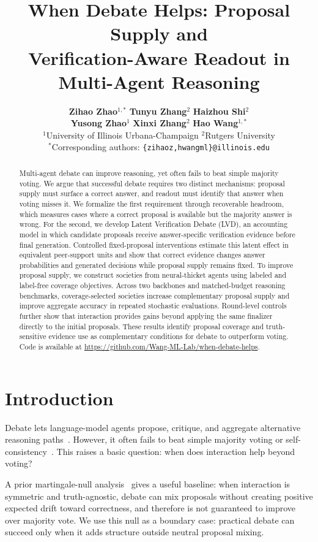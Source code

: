 \documentclass{article}
\title{When Debate Helps:
Proposal Supply and\\Verification-Aware Readout in Multi-Agent Reasoning}
\author{
  \textbf{Zihao Zhao}$^{1,*}$ \quad
  \textbf{Tunyu Zhang}$^{2}$ \quad
  \textbf{Haizhou Shi}$^{2}$
  \\[0.35em]
  \textbf{Yusong Zhao}$^{1}$ \quad
  \textbf{Xinxi Zhang}$^{2}$ \quad
  \textbf{Hao Wang}$^{1,*}$
  \\
  $^{1}$University of Illinois Urbana-Champaign \quad
  $^{2}$Rutgers University
  \\
  $^{*}$Corresponding authors: \texttt{\{zihaoz,hwangml\}@illinois.edu}
}
\newcommand{\readout}{Latent Verification Debate}
\begin{document}
\maketitle

\begin{abstract}
Multi-agent debate can improve reasoning, yet often fails to beat simple
majority voting. We argue that successful debate requires two distinct
mechanisms: proposal supply must surface a correct answer, and readout must
identify that answer when voting misses it. We formalize the first requirement
through recoverable headroom, which measures cases where a correct proposal is
available but the majority answer is wrong. For the second, we develop
\readout{} (LVD), an accounting model in which candidate proposals receive
answer-specific verification evidence before final generation. Controlled
fixed-proposal interventions estimate this latent effect in equivalent
peer-support units and show that correct evidence changes answer probabilities
and generated decisions while proposal supply remains fixed. To
improve proposal supply, we construct societies from neural-thicket agents
using labeled and label-free coverage objectives. Across two backbones and
matched-budget reasoning benchmarks, coverage-selected societies increase
complementary proposal supply and improve aggregate accuracy in repeated
stochastic evaluations. Round-level controls further show that interaction
provides gains beyond applying the same finalizer directly to the initial
proposals. These results identify proposal coverage and truth-sensitive
evidence use as complementary conditions for debate to outperform voting.
Code is available at
\url{https://github.com/Wang-ML-Lab/when-debate-helps}.
\end{abstract}

\section{Introduction}

Debate lets language-model agents propose, critique, and aggregate alternative
reasoning paths~\citep{du2024improving, chanchateval, xiong2023examining, estornellacc}. However, it often fails to beat
simple majority voting or self-consistency~\citep{wang2023selfconsistency, wang2024rethinking}. This raises a basic question: when does interaction help beyond
voting?

A prior martingale-null analysis~\citep{choi2026debate} gives a useful baseline: when interaction is
symmetric and truth-agnostic, debate can mix proposals without creating positive
expected drift toward correctness, and therefore is not guaranteed to improve
over majority vote.
We use this null as a boundary case: practical debate can succeed only when it
adds structure outside neutral proposal mixing.
\end{document}
